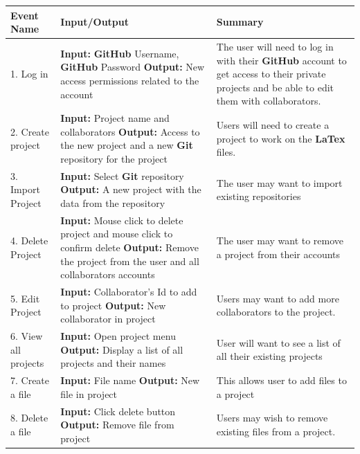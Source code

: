 \documentclass[12pt, titlepage]{article}
\begin{document}
	\begin{longtable}{|p{4cm}|p{5cm}|p{5cm}|}
		\hline
		\textbf{Event Name} & \textbf{Input/Output} & \textbf{Summary} \\
		\hline
		1. Log in & \textbf{Input:} \textbf{GitHub} Username, \textbf{GitHub} Password \newline \textbf{Output:} New access permissions related to the account & The user will need to log in with their \textbf{GitHub} account to get access to their private projects and be able to edit them with collaborators.\\
		\hline
		2. Create project & \textbf{Input:} Project name and collaborators \newline \textbf{Output:} Access to the new project and a new \textbf{Git} repository for the project & Users will need to create a project to work on the \textbf{LaTex} files.\\
		\hline
		3. Import Project & \textbf{Input:} Select \textbf{Git} repository \newline \textbf{Output:} A new project with the data from the repository & The user may want to import existing repositories\\
		\hline
		4. Delete Project & \textbf{Input:} Mouse click to delete project and mouse click to confirm delete \newline \textbf{Output:} Remove the project from the user and all collaborators accounts & The user may want to remove a project from their accounts\\
		\hline
		5. Edit Project & \textbf{Input:} Collaborator's Id to add to project \newline \textbf{Output:} New collaborator in project & Users may want to add more collaborators to the project.\\
		\hline
		6. View all projects & \textbf{Input:} Open project menu \newline \textbf{Output:} Display a list of all projects and their names & User will want to see a list of all their existing projects\\
		\hline
		7. Create a file & \textbf{Input:} File name \newline \textbf{Output:} New file in project & This allows user to add files to a project\\
		\hline
		8. Delete a file & \textbf{Input:} Click delete button  \newline \textbf{Output:} Remove file from project &  Users may wish to remove existing files from a project.\\

\end{longtable}
\end{document}
